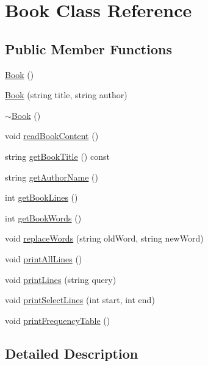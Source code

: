 \hypertarget{class_book}{\section{Book Class Reference}
\label{class_book}
}
\subsection*{Public Member Functions}
\begin{DoxyCompactItemize}
\item 
\hyperlink{class_book_a2eac9e235a08763158f78533f7a83e1f}{Book} ()
\item 
\hyperlink{class_book_a98dad89c9f945e0d846c81ce7e459fbc}{Book} (string title, string author)
\item 
\hyperlink{class_book_a0ba8eceb34ea1301bc08942e37824767}{$\sim$\+Book} ()
\item 
void \hyperlink{class_book_a3e62d70f19bf6fa8ebef5556882b3ed7}{read\+Book\+Content} ()
\item 
string \hyperlink{class_book_aae6e165b712f111beb53574cd2f53776}{get\+Book\+Title} () const 
\item 
string \hyperlink{class_book_a651503f226fbf2c9c050f9527a3b983e}{get\+Author\+Name} ()
\item 
int \hyperlink{class_book_a8f241d57fb5525e3008b3f3d6ba81291}{get\+Book\+Lines} ()
\item 
int \hyperlink{class_book_a6f0ccce41fd8db486578e0d325605813}{get\+Book\+Words} ()
\item 
void \hyperlink{class_book_aaf182e24b86624b6ff54fba2581094a4}{replace\+Words} (string old\+Word, string new\+Word)
\item 
void \hyperlink{class_book_a07076ae8fe5e924f18bf7527e0ba5092}{print\+All\+Lines} ()
\item 
void \hyperlink{class_book_a0c019a8318999229bf506f7f64e67a85}{print\+Lines} (string query)
\item 
void \hyperlink{class_book_a7193030998d6251851be26196762f8e6}{print\+Select\+Lines} (int start, int end)
\item 
void \hyperlink{class_book_ac8b57c6a725ae9afeb24e6e74d4f8fd0}{print\+Frequency\+Table} ()
\end{DoxyCompactItemize}


\subsection{Detailed Description}


